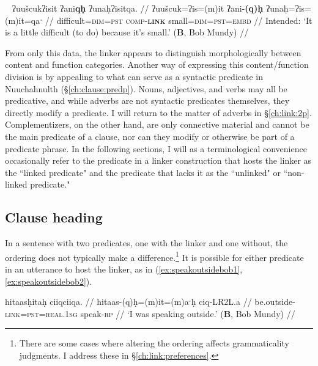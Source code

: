 \ex~ \label{ex:hardsmall2}
\begingl
\glpreamble *ʔuušcukʔisit ʔani\textbf{qḥ} ʔunaḥʔisitqa. //
\gla ʔuušcuk=ʔis=(m)it ʔani-\textbf{(q)ḥ} ʔunaḥ=ʔis=(m)it=qaˑ //
\glb difficult=\textsc{dim}=\textsc{pst} \textsc{comp}-\textbf{\textsc{link}} small=\textsc{dim}=\textsc{pst}=\textsc{embd} //
\glft Intended: `It is a little difficult (to do) because it's small.' (\textbf{B}, Bob Mundy) //
\endgl
\xe

From only this data, the linker appears to distinguish morphologically between content and function categories. Another way of expressing this content/function division is by appealing to what can serve as a syntactic predicate in Nuuchahnulth (\S\ref{ch:clause:predp}). Nouns, adjectives, and verbs may all be predicative, and while adverbs are not syntactic predicates themselves, they directly modify a predicate. I will return to the matter of adverbs in \S\ref{ch:link:2p}. Complementizers, on the other hand, are only connective material and cannot be the main predicate of a clause, nor can they modify or otherwise be part of a predicate phrase. In the following sections, I will as a terminological convenience occasionally refer to the predicate in a linker construction that hosts the linker as the ``linked predicate" and the predicate that lacks it as the ``unlinked" or ``non-linked predicate."


\subsection{Clause heading} \label{ch:link:clause}

In a sentence with two predicates, one with the linker and one without, the ordering does not typically make a difference.\footnote{There are some cases where altering the ordering affects grammaticality judgments. I address these in \S\ref{ch:link:preferences}.} It is possible for either predicate in an utterance to host the linker, as in (\ref{ex:speakoutsidebob1}, \ref{ex:speakoutsidebob2}).

\ex \label{ex:speakoutsidebob1}
\begingl
\glpreamble hitaasḥitaḥ ciiqciiqa. //
\gla hitaas-(q)ḥ=(m)it=(m)aˑḥ ciq-LR2L.a //
\glb be.outside-\textsc{link}=\textsc{pst}=\textsc{real.1sg} speak-\textsc{rp} //
\glft `I was speaking outside.' (\textbf{B}, Bob Mundy) //
\endgl
\xe

